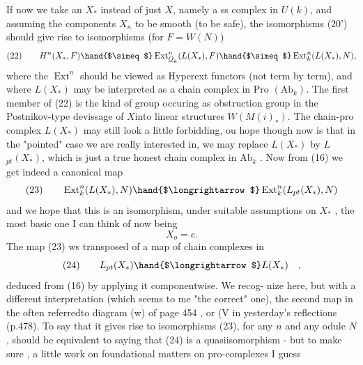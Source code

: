 If now we take an $X_*$ instead of just $X$, namely a ss complex in
$U(k)$, and assuming the components $X_n$ to be smooth (to be safe), the
isomorphisms (20') should give rise to isomorphisms (for $F=W(N)$)
\[ (22) \qquad H^n(X_*, F ) \hand{$\simeq$} \operatorname{Ext}^n_{\underline{O}_k}(L(X_*), F) \hand{$\simeq$} \operatorname{Ext}^n_k(L(X_*),N) , \]
where the $\operatorname{Ext}^n$ should be viewed as Hyperext functors (not term by
term), and where  $L(X_*)$ may be interpreted as a chain complex in
Pro $(\mathrm{Ab}_k)$. The first member of (22) is the kind of group occuring as
obstruction group in the Postnikov-type devissage of $X$\hand{$_*$}into linear
structures $W(M(i)_*)$. The chain-pro complex $L(X_*)$ may still look a
 little forbidding, ou hope though now is that in the "pointed" case
we are really interested in, we may replace $L(X_*)$ by $L$$_{pt}(X_*)$, which
is just a true honest chain complex in $\mathrm{Ab}_k$ . Now from (16) we get indeed
a canonical map
\[ (23) \qquad \operatorname{Ext}^n_k(L(X_*), N ) \hand{$\longrightarrow$} \operatorname{Ext}^n_k(L_{pt}(X_*), N ) \]
and we hope that this is an isomorphism, under suitable assumptions on
$X_*$ , the most basic one I can think of now being
\[ X_o = e . \]
The map (23) ws  transposed of a map of chain complexes in  
\[ (24) \qquad L_{pt}(X_*) \hand{$\longrightarrow$} L(X_*) \quad , \]
 deduced from (16) by applying it componentwise. We recog-%
nize here, but with a different interpretation (which seems to me
"the correct" one), the second map in the often referred\hand{-}to diagram (w)
of page 454 , or (V\hand{)} in yesterday's reflections (p.478). To say that
it gives rise to isomorphisms (23), for any $n$ and any odule $N$, should
be equivalent to saying that (24) is a quasiisomorphism - but to
make sure  ,    a little work on foundational
matters on pro-complexes I guess\hand{;} 

